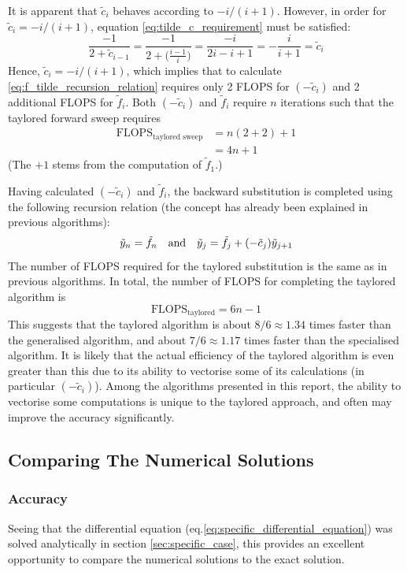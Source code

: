 \documentclass[reprint,english]{revtex4-1}
\begin{document}
It is apparent that \(\tilde{c}_i\) behaves according to \(-i/(i+1)\). However, in order for \(\tilde{c}_i=-i/(i+1)\), equation \eqref{eq:tilde_c_requirement} must be satisfied:
\[\frac{-1}{2+\tilde{c}_{i-1}}=\frac{-1}{2+\big(\frac{i-1}{i}\big)}=\frac{-i}{2i-i+1}=-\frac{i}{i+1}=\tilde{c}_i\]
Hence, \(\tilde{c}_i=-i/(i+1)\), which implies that to calculate \eqref{eq:f_tilde_recursion_relation} requires only 2 FLOPS for \((-\tilde{c}_i)\) and 2 additional FLOPS for \(\tilde{f}_i\). Both \((-\tilde{c}_i)\) and \(\tilde{f}_i\) require \(n\) iterations such that the taylored forward sweep requires
\begin{align}
\text{FLOPS}_{\text{taylored sweep}}&=n(2+2)+1\nonumber\\
&=4n+1
\end{align}
(The \(+1\) stems from the computation of \(\tilde{f}_1\).)

Having calculated \((-\tilde{c}_i)\) and \(\tilde{f}_i\), the backward substitution is completed using the following recursion relation (the concept has already been explained in previous algorithms):
\begin{equation}
\tilde{y}_n=\tilde{f}_n\qand\tilde{y}_j=\tilde{f}_j+(-\tilde{c}_j)\tilde{y}_{j+1}
\end{equation}
The number of FLOPS required for the taylored substitution is the same as in previous algorithms. In total, the number of FLOPS for completing the taylored algorithm is
\begin{equation}
\text{FLOPS}_{\text{taylored}}=6n-1
\end{equation}
This suggests that the taylored algorithm is about \(8/6\approx1.34\) times faster than the generalised algorithm, and about \(7/6\approx1.17\) times faster than the specialised algorithm. It is likely that the actual efficiency of the taylored algorithm is even greater than this due to its ability to vectorise some of its calculations (in particular \((-\tilde{c}_i)\)). Among the algorithms presented in this report, the ability to vectorise some computations is unique to the taylored approach, and often may improve the accuracy significantly.
\newpage
\subsection{Comparing The Numerical Solutions}
\subsubsection{Accuracy}
Seeing that the differential equation (eq.\eqref{eq:specific_differential_equation}) was solved analytically in section \ref{sec:specific_case}, this provides an excellent opportunity to compare the numerical solutions to the exact solution.
\end{document}
